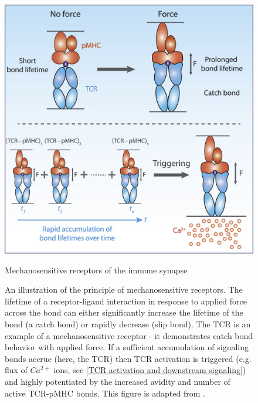 \begin{figure}[htbp]
	\centering
	\includegraphics[width=\textwidth]{../figures/chapter1/tcrcatchbond.jpg}
	\caption{Mechanosensitive receptors of the immune synapse}
	\caption*{An illustration of the principle of mechanosensitive receptors. The lifetime of a receptor-ligand interaction in response to applied force across the bond can either significantly increase the lifetime of the bond (a catch bond) or rapidly decrease (slip bond). The TCR is an example of a mechanosensitive receptor -  it demonstrates catch bond behavior with applied force. If a sufficient accumulation of signaling bonds accrue (here, the TCR) then TCR activation is triggered (e.g. flux of $Ca^{2+}$ ions, see \ref{TCR activation and downstream signaling}) and highly potentiated by the increased avidity and number of active TCR-pMHC bonds. This figure is adapted from \cite{Liu2014}.}
	\label{fig:tcrcatchbond}
\end{figure}

